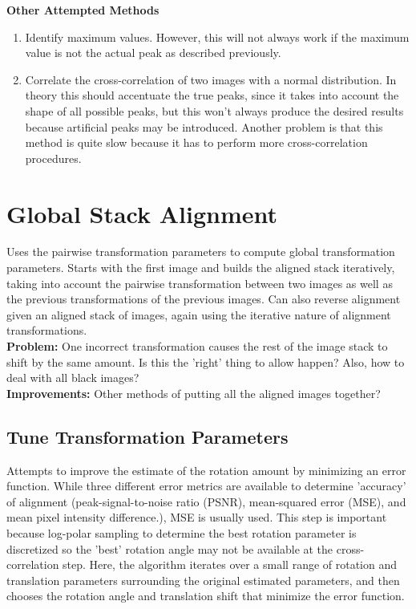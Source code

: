 \documentclass{article}
\begin{document}
\textbf{Other Attempted Methods}
\begin{enumerate}
\item Identify maximum values. However, this will not always work if the maximum value is not the actual peak as described previously. 
\item Correlate the cross-correlation of two images with a normal distribution. In theory this should accentuate the true peaks, since it takes into account the shape of all possible peaks, but this won't always produce the desired results because artificial peaks may be introduced. Another problem is that this method is quite slow because it has to perform more cross-correlation procedures. 
\end{enumerate}

\section{Global Stack Alignment}
Uses the pairwise transformation parameters to compute global transformation parameters. Starts with the first image and builds the aligned stack iteratively, taking into account the pairwise transformation between two images as well as the previous transformations of the previous images. Can also reverse alignment given an aligned stack of images, again using the iterative nature of alignment transformations. \\
\textbf{Problem:} One incorrect transformation causes the rest of the image stack to shift by the same amount. Is this the 'right' thing to allow happen? Also, how to deal with all black images? \\
\textbf{Improvements:} Other methods of putting all the aligned images together?

\subsection{Tune Transformation Parameters}
Attempts to improve the estimate of the rotation amount by minimizing an error function. While three different error metrics are available to determine 'accuracy' of alignment (peak-signal-to-noise ratio (PSNR), mean-squared error (MSE), and mean pixel intensity difference.), MSE is usually used. This step is important because log-polar sampling to determine the best rotation parameter is discretized so the 'best' rotation angle may not be available at the cross-correlation step. Here, the algorithm iterates over a small range of rotation and translation parameters surrounding the original estimated parameters, and then chooses the rotation angle and translation shift that minimize the error function.
\end{document}
